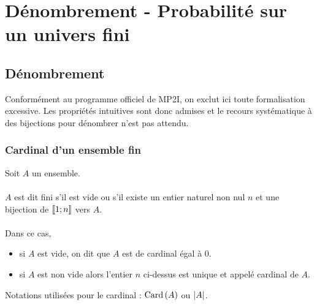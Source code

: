 \chapter{Dénombrement - Probabilité sur un univers fini}
\minitoc
\section{Dénombrement}
    Conformément au programme officiel de MP2I, on exclut ici toute formalisation excessive. Les propriétés intuitives sont donc admises et le recours systématique à des bijections pour dénombrer n’est pas attendu.
\subsection{Cardinal d’un ensemble fin}
\begin{defi}
    Soit \(A\) un ensemble.\\~\\
    \(A\) est dit fini s’il est vide ou s’il existe un entier naturel non nul \(n\) et une bijection de \(\left\llbracket1;n\right\rrbracket\) vers \(A\).\\~\\
    Dans ce cas,
    \begin{itemize}
        \item si \(A\) est vide, on dit que \(A\) est de cardinal égal à \(0\).
        \item si \(A\) est non vide alors l’entier \(n\) ci-dessus est unique et appelé cardinal de \(A\).
    \end{itemize}
    Notations utilisées pour le cardinal : \(\operatorname{Card}\left(A\right)\) ou \(\left\lvert A\right\rvert\).
\end{defi}
